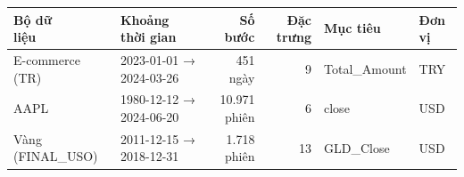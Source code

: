 \begin{tabular}{llrrll}
\toprule
\makecell[l]{Bộ dữ\\liệu} & \makecell[l]{Khoảng\\thời gian} & Số bước & Đặc trưng & Mục tiêu & Đơn vị \\
\midrule
E-commerce (TR) & 2023-01-01 → 2024-03-26 & 451 ngày & 9 & Total\_Amount & TRY \\
AAPL & 1980-12-12 → 2024-06-20 & 10{.}971 phiên & 6 & close & USD \\
Vàng (FINAL\_USO) & 2011-12-15 → 2018-12-31 & 1{.}718 phiên & 13 & GLD\_Close & USD \\
\bottomrule
\end{tabular}
